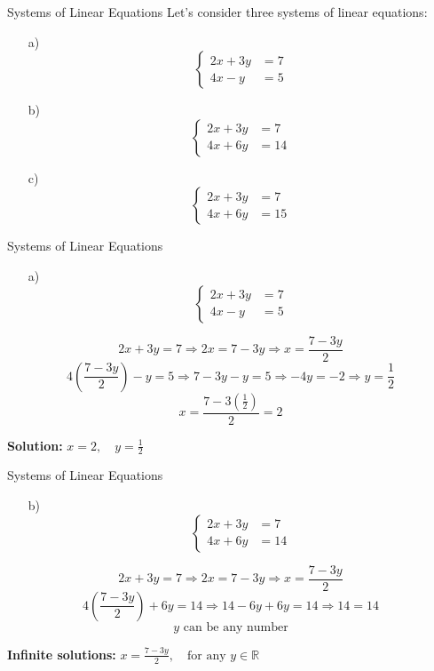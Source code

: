\documentclass{beamer}
\newcommand{\R}{\mathbb{R}}
\begin{document}


\begin{frame}{Systems of Linear Equations}
  Let's consider three systems of linear equations:
  \begin{itemize}
      \item[a)]\[
  \begin{cases}
  2x + 3y &= 7 \\
    4x - y &= 5
  \end{cases}
  \]
  \item[b)]     \[
  \begin{cases}
    2x + 3y &= 7 \\
    4x + 6y &= 14
  \end{cases}
  \]  
  \item[c)]     \[
  \begin{cases}
    2x + 3y &= 7 \\
    4x + 6y &= 15
  \end{cases}
  \]  
  \end{itemize}

\end{frame}

\begin{frame}{Systems of Linear Equations}
  \begin{itemize}
      \item[a)]\[
  \begin{cases}
  2x + 3y &= 7 \\
    4x - y &= 5
  \end{cases}
  \]
  \end{itemize}
\[
  2x + 3y = 7 \Rightarrow 2x = 7 - 3y \Rightarrow x = \frac{7 - 3y}{2}
  \]
  \pause
  \[
  4\left(\frac{7 - 3y}{2}\right) - y = 5 \Rightarrow 7 - 3y - y = 5 \Rightarrow -4y = -2 \Rightarrow y = \frac{1}{2}
  \]\pause
  \[
  x = \frac{7 - 3(\frac{1}{2})}{2} = 2
  \]
  
  \pause
  
  \textbf{Solution:} \(x = 2, \quad y = \frac{1}{2}\)
\end{frame}

  
\begin{frame}{Systems of Linear Equations}
    \begin{itemize}
  \item[b)]     \[
  \begin{cases}
    2x + 3y &= 7 \\
    4x + 6y &= 14
  \end{cases}
  \]  
  \end{itemize}
  \[
  2x + 3y = 7 \Rightarrow 2x = 7 - 3y \Rightarrow x = \frac{7 - 3y}{2}
  \]
  \pause  
  \[
  4\left(\frac{7 - 3y}{2}\right) + 6y = 14 \Rightarrow 14-6y + 6y = 14 \Rightarrow 14=14
  \]
  \pause
    \[
  y \text{ can be any number}
  \]
  
  \pause
  
  \textbf{Infinite solutions:} \(x =  \frac{7 - 3y}{2},\quad \text{for any }y\in\R\)
\end{frame}
\end{document}
